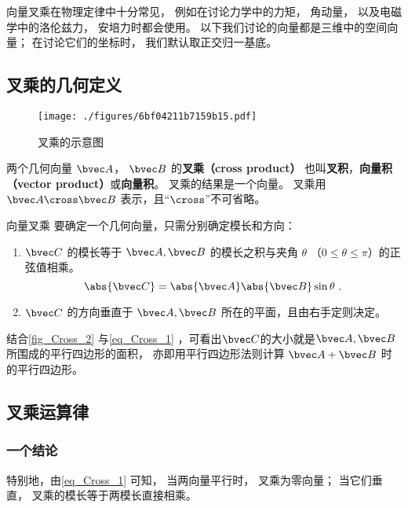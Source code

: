 

向量叉乘在物理定律中十分常见， 例如在讨论力学中的力矩， 角动量， 以及电磁学中的洛伦兹力， 安培力时都会使用。 以下我们讨论的向量都是三维中的空间向量； 在讨论它们的坐标时， 我们默认取正交归一基底。

\subsection{叉乘的几何定义}

\begin{figure}[ht]
\centering
\texttt{[image: ./figures/6bf04211b7159b15.pdf]}
\caption{叉乘的示意图} \label{fig_Cross_2}
\end{figure}

两个几何向量 $\bvec A$，  $\bvec B$ 的\textbf{叉乘（cross product）} 也叫\textbf{叉积}，\textbf{向量积（vector product）}或\textbf{向量积}。 叉乘的结果是一个向量。  叉乘用 $\bvec A \cross \bvec B$ 表示，且“$\cross$”不可省略。

\begin{definition}{向量叉乘}\label{def_Cross_1}
要确定一个几何向量，只需分别确定模长和方向：
\begin{enumerate}
\item $\bvec C$ 的模长等于 $\bvec A, \bvec B$ 的模长之积与夹角 $\theta$ （$0 \leqslant \theta \leqslant \pi$）的正弦值相乘。
\begin{equation}\label{eq_Cross_1}
\abs{\bvec C}  = \abs{\bvec A} \abs{\bvec B} \sin\theta ~.
\end{equation}
\item $\bvec C$ 的方向垂直于 $\bvec A, \bvec B$ 所在的平面，且由右手定则决定。
\end{enumerate}
\end{definition}

结合\autoref{fig_Cross_2} 与\autoref{eq_Cross_1} ，可看出$\bvec C$的大小就是$\bvec A, \bvec B$所围成的平行四边形的面积， 亦即用平行四边形法则计算 $\bvec A + \bvec B$ 时的平行四边形。

\subsection{叉乘运算律}
\subsubsection{一个结论}
特别地，由\autoref{eq_Cross_1} 可知， 当两向量平行时， 叉乘为零向量； 当它们垂直， 叉乘的模长等于两模长直接相乘。%

